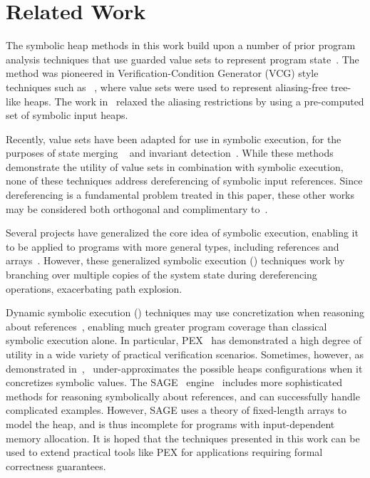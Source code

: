 \section{Related Work}
\label{sec:related}
%
The symbolic heap methods in this work build upon a
number of prior program analysis techniques that use guarded value sets to
represent program
state~\cite{Sen:2014,Torlak:2014,Yorsh:2008,Xie:2005,Dillig:2011,Elkarablieh:2009}. 
The method was pioneered in Verification-Condition Generator (VCG) style techniques such as ~\cite{Xie:2005,Yorsh:2008}, where value sets were used to 
represent aliasing-free tree-like heaps. The work in~\cite{Dillig:2011} relaxed the aliasing restrictions by using a pre-computed set of symbolic input heaps.

Recently, value sets have been adapted for use in symbolic execution, for the purposes of state merging ~\cite{Sen:2014,Torlak:2014} and invariant detection~\cite{Ferrara:2014}. While these methods demonstrate the utility of value sets in combination with symbolic execution, none of these techniques address dereferencing of symbolic input references. Since dereferencing is a fundamental problem treated in this paper, these other works may be considered both orthogonal and complimentary to~\symtxt{}.

Several projects have generalized the core idea of symbolic execution,
enabling it to be applied to programs with more general types,
including references and
arrays~\cite{GSE03,KiasanKunit,Cadar:2008,Rosner:2015}. However, these
generalized symbolic execution (\gsetxt{}) techniques work by branching over
multiple copies of the system state during dereferencing operations,
exacerbating path explosion.

Dynamic symbolic execution (\dsetxt{}) techniques may use
concretization when reasoning about references~\cite{Godefroid:2005,Sen:2005,Godefroid:POPL07,Tillmann:2008}, enabling much greater program
coverage than classical symbolic execution alone. In particular, PEX~\cite{Tillmann:2008}
has demonstrated a high degree of utility in a wide variety of 
practical verification scenarios. Sometimes,
however, as demonstrated in~\cite{Elkarablieh:2009},~\dsetxt{}
under-approximates the possible heaps configurations when it
concretizes symbolic values. The SAGE~\dsetxt{}
engine~\cite{Elkarablieh:2009} includes more sophisticated methods for
reasoning symbolically about references, and can successfully handle
complicated examples. However, SAGE uses a
theory of fixed-length arrays to model the heap, and is thus incomplete
for programs with input-dependent memory allocation. It is hoped that the 
techniques presented in this work can be used to extend practical tools 
like PEX for applications requiring formal correctness guarantees.

